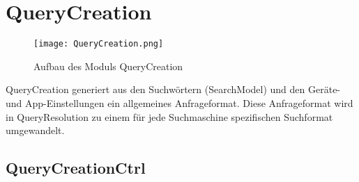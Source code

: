
\section{QueryCreation}

\begin{figure}[htb]
   \centering
  	\texttt{[image: QueryCreation.png]}
  	\caption{Aufbau des Moduls QueryCreation}
	\label{fig:Aufbau des Moduls QueryCreation}
\end{figure}

QueryCreation generiert aus den Suchwörtern (SearchModel) und den Geräte- und App-Einstellungen ein allgemeines Anfrageformat. Diese Anfrageformat wird in QueryResolution zu einem für jede Suchmaschine spezifischen Suchformat umgewandelt.

\subsection{QueryCreationCtrl}

